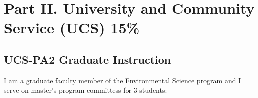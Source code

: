 %
%
%
%
%
%
%
%
%

\pagebreak
\section{Part II. University and Community Service (UCS) 15\%}


\subsection{UCS-PA2 Graduate Instruction}

I am a graduate faculty member of the Environmental Science program and I serve on master's program committess for 3 students:

